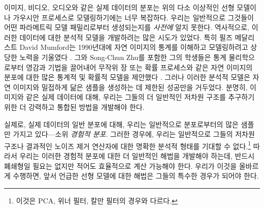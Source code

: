 \documentclass[../../book-main_ko.tex]{subfiles}
\begin{document}
이미지, 비디오, 오디오와 같은 실제 데이터의 분포는 위의 다소 이상적인 선형 모델이나 가우시안 프로세스로 모델링하기에는 너무 복잡하다. 우리는 일반적으로 그것들이 어떤 파라메트릭 모델 패밀리로부터 생성되는지를 \textit{사전에} 알지 못한다. 역사적으로, 이러한 데이터에 대한 분석적 모델을 개발하려는 많은 시도가 있었다. 특히 필즈 메달리스트 David Mumford는 1990년대에 자연 이미지의 통계를 이해하고 모델링하려고 상당한 노력을 기울였다 \cite{Mumford1996TheSD}. 그와 Song-Chun Zhu를 포함한 그의 학생들은 통계 물리학으로부터 영감과 기법을 끌어내어 무작위 장 또는 확률 프로세스와 같은 자연 이미지의 분포에 대한 많은 통계적 및 확률적 모델을 제안했다 \cite{Zhu-Entropy-1997,Zhu1997LearningGP,Zhu1997Prior,Huang-Mumford,Mumford-1999,Lee-Mumford}. 그러나 이러한 분석적 모델은 자연 이미지와 밀접하게 닮은 샘플을 생성하는 데 제한된 성공만을 거두었다. 분명히, 이미지와 같은 실제 데이터에 대해, 우리는 그들의 더 일반적인 저차원 구조를 추구하기 위한 더 강력하고 통합된 방법을 개발해야 한다.

실제로, 실제 데이터의 일반 분포에 대해, 우리는 일반적으로 분포로부터의 많은 샘플만 가지고 있다---소위 \textit{경험적 분포}. 그러한 경우에, 우리는 일반적으로 그들의 저차원 구조나 결과적인 노이즈 제거 연산자에 대한 명확한 분석적 형태를 기대할 수 없다.\footnote{이것은 PCA, 위너 필터, 칼만 필터의 경우와 다르다.} 따라서 우리는 이러한 경험적 분포에 대한 더 일반적인 해법을 개발해야 하는데, 반드시 폐쇄형일 필요는 없지만 적어도 효율적으로 계산 가능해야 한다. 우리가 이것을 올바르게 수행하면, 앞서 언급한 선형 모델에 대한 해법은 그들의 특수한 경우가 되어야 한다.
\end{document}
